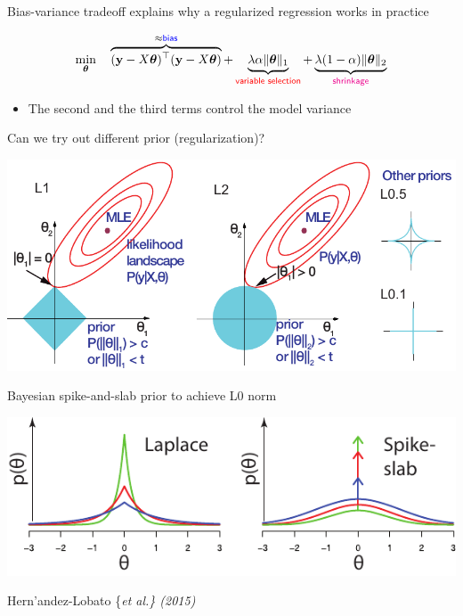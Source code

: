 \documentclass[
  ignorenonframetext,
  aspectratio=169]{beamer}
\providecommand{\tightlist}{%
  \setlength{\itemsep}{0pt}\setlength{\parskip}{0pt}}
\begin{document}
\begin{frame}{Bias-variance tradeoff explains why a regularized
regression works in practice}
\protect\hypertarget{bias-variance-tradeoff-explains-why-a-regularized-regression-works-in-practice}{}
\large

\[
\min_{\boldsymbol{\theta}} \quad
\overbrace{(\mathbf{y} - X\boldsymbol{\theta})^{\top}(\mathbf{y} - X\boldsymbol{\theta})}^{\approx \textsf{\color{blue} bias}} + \underbrace{\lambda \alpha \|\boldsymbol{\theta}\|_{1}}_{\textsf{\color{red} variable selection}} + \underbrace{\lambda (1 - \alpha) \|\boldsymbol{\theta}\|_{2}}_{\textsf{\color{magenta} shrinkage}}
\]

\begin{itemize}
\tightlist
\item
  The second and the third terms control the model variance
\end{itemize}
\end{frame}

\begin{frame}{Can we try out different prior (regularization)?}
\protect\hypertarget{can-we-try-out-different-prior-regularization}{}
\centerline{\includegraphics[width=.75\textwidth]{Vis/L1L2.pdf}}
\end{frame}

\begin{frame}{Bayesian spike-and-slab prior to achieve L0 norm}
\protect\hypertarget{bayesian-spike-and-slab-prior-to-achieve-l0-norm}{}
\centerline{\includegraphics[width=.75\textwidth]{Vis/SS.pdf}}

\vfill

Hern'andez-Lobato \{\it et al.\} (2015)
\end{frame}
\end{document}
